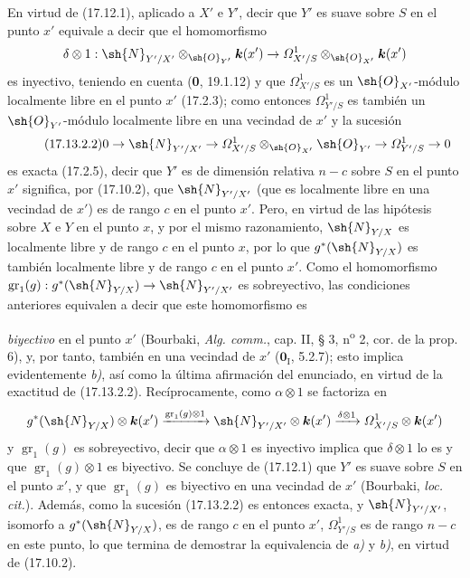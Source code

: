 En virtud de (17.12.1), aplicado a $X'$ e $Y'$, decir que $Y'$ es suave sobre $S$ en el punto $x'$ equivale a decir que el homomorfismo
\[
\delta\otimes1:\sh{N}_{Y'/X'}\otimes_{\sh{O}_{Y'}}\boldsymbol{k}(x')\to\varOmega^1_{X'/S}\otimes_{\sh{O}_{X'}}\boldsymbol{k}(x')
\]
es inyectivo, teniendo en cuenta (\textbf 0, 19.1.12) y que $\varOmega^1_{X'/S}$ es un $\sh{O}_{X'}$-módulo localmente libre en el punto $x'$ (17.2.3); como entonces $\varOmega^1_{Y'/S}$ es también un $\sh{O}_{Y'}$-módulo localmente libre en una vecindad de $x'$ y la sucesión
\[
\label{IV.17.13.2.2}
\tag{17.13.2.2}
0\to\sh{N}_{Y'/X'}\to\varOmega^1_{X'/S}\otimes_{\sh{O}_{X'}}\sh{O}_{Y'}\to\varOmega^1_{Y'/S}\to0
\]
es exacta (17.2.5), decir que $Y'$ es de dimensión relativa $n-c$ sobre $S$ en el punto $x'$ significa, por (17.10.2), que $\sh{N}_{Y'/X'}$ (que es localmente libre en una vecindad de $x'$) es de rango $c$ en el punto $x'$. Pero, en virtud de las hipótesis sobre $X$ e $Y$ en el punto $x$, y por el mismo razonamiento, $\sh{N}_{Y/X}$ es localmente libre y de rango $c$ en el punto $x$, por lo que $g^*(\sh{N}_{Y/X})$ es también localmente libre y de rango $c$ en el punto $x'$. Como el homomorfismo $\operatorname{gr}_1(g):g^*(\sh{N}_{Y/X})\to\sh{N}_{Y'/X'}$ es sobreyectivo, las condiciones anteriores equivalen a decir que este homomorfismo es


\emph{biyectivo} en el punto $x'$ (Bourbaki, \emph{Alg. comm.}, cap. II, § 3, n\textsuperscript{o} 2, cor. de la prop. 6), y, por tanto, también en una vecindad de $x'$ ($\mathbf{0}_{\mathrm I}$, 5.2.7); esto implica evidentemente \emph{b)}, así como la última afirmación del enunciado, en virtud de la exactitud de (17.13.2.2). Recíprocamente, como $\alpha\otimes1$ se factoriza en
\[
g^*(\sh{N}_{Y/X})\otimes\boldsymbol{k}(x')\xrightarrow{\operatorname{gr}_1(g)\otimes1}\sh{N}_{Y'/X'}\otimes\boldsymbol{k}(x')\xrightarrow{\delta\otimes1}\varOmega^1_{X'/S}\otimes\boldsymbol{k}(x')
\]
y $\operatorname{gr}_1(g)$ es sobreyectivo, decir que $\alpha\otimes1$ es inyectivo implica que $\delta\otimes1$ lo es y que $\operatorname{gr}_1(g)\otimes1$ es biyectivo. Se concluye de (17.12.1) que $Y'$ es suave sobre $S$ en el punto $x'$, y que $\operatorname{gr}_1(g)$ es biyectivo en una vecindad de $x'$ (Bourbaki, \emph{loc. cit.}). Además, como la sucesión (17.13.2.2) es entonces exacta, y $\sh{N}_{Y'/X'}$, isomorfo a $g^*(\sh{N}_{Y/X})$, es de rango $c$ en el punto $x'$, $\varOmega^1_{Y'/S}$ es de rango $n-c$ en este punto, lo que termina de demostrar la equivalencia de \emph{a)} y \emph{b)}, en virtud de (17.10.2).

